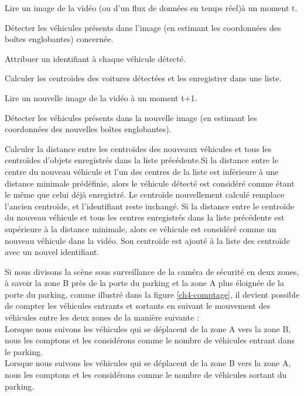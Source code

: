 \begin{outline}[enumerate]
    \1  Lire un image de la vidéo (ou d'un flux de données en temps réel)à un moment t.
    
    \1  Détecter les véhicules présents dans l'image (en estimant les coordonnées des boîtes englobantes) concernée.
    
    \1  Attribuer un identifiant à chaque véhicule détecté.
    
    \1  Calculer les centroïdes des voitures détectées et les enregistrer dans une liste. 
    
    \1  Lire un nouvelle image de la vidéo à un moment t+1.
    
    \1  Détecter les véhicules présents dans la nouvelle image (en estimant les coordonnées des nouvelles boîtes englobantes).
    
    \1  Calculer la distance entre les centroïdes des nouveaux véhicules et tous les centroïdes d'objets enregistrés dans la liste précédente.Si la distance entre le centre du nouveau véhicule et l'un des centres de la liste est inférieure à une distance minimale prédéfinie, alors le véhicule détecté est considéré comme étant le même que celui déjà enregistré. Le centroïde nouvellement calculé remplace l'ancien centroïde, et l'identifiant reste inchangé. Si la distance entre le centroïde du nouveau véhicule et tous les centres enregistrés dans la liste précédente est supérieure à la distance minimale, alors ce véhicule est considéré comme un nouveau véhicule dans la vidéo. Son centroïde est ajouté à la liste des centroïde avec un nouvel identifiant.
\end{outline}

Si nous divisons la scène sous surveillance de la caméra de sécurité en deux zones,  à savoir la zone B près de la porte du parking et la zone A plus éloignée de la porte du parking, comme illustré dans la figure \ref{ch4-comptage}, il devient possible de compter les véhicules entrants et sortants en suivant le mouvement des véhicules entre les deux zones de la manière suivante :\\
Lorsque nous suivons les véhicules qui se déplacent de la zone A vers la zone B, nous les comptons et les considérons comme le nombre de véhicules entrant dans le parking.\\
Lorsque nous suivons les véhicules qui se déplacent de la zone B vers la zone A, nous les comptons et les considérons comme le nombre de véhicules sortant du parking.

